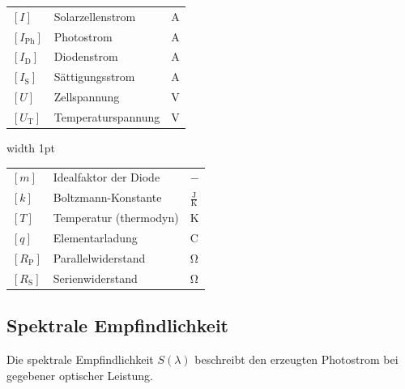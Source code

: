 \begin{minipage}[t]{0.42\columnwidth}
    \renewcommand{\arraystretch}{1.2}
    \begin{tabular}{@{} l p{2.5cm} l @{}}
        $[I]$             & Solarzellenstrom \dotfill                          & $\mathrm{A}$ \\
        $[I_\text{Ph}]$   & Photostrom \dotfill                    & $\mathrm{A}$ \\
        $[I_\text{D}]$    & Diodenstrom \dotfill                                   & $\mathrm{A}$ \\
        $[I_\text{S}]$    & Sättigungsstrom \dotfill                     & $\mathrm{A}$ \\
        $[U]$             & Zellspannung \dotfill                                  & $\mathrm{V}$ \\
        $[U_\text{T}]$    & Temperaturspannung \dotfill                            & $\mathrm{V}$ \\
    \end{tabular}
\end{minipage}
\hfill
\vrule width 1pt
\hfill
\begin{minipage}[t]{0.56\columnwidth}
    \renewcommand{\arraystretch}{1.2}
    \begin{tabular}{@{} l p{3.1cm} l @{}}
        $[m]$             & Idealfaktor der Diode \dotfill & $-$ \\
        $[k]$           & Boltzmann-Konstante  \dotfill & $\mathrm{\frac{J}{K}}$ \\
        $[T]$           & Temperatur (thermodyn) \dotfill          & $\mathrm{K}$ \\
        $[q]$           & Elementarladung \dotfill & $\mathrm{C}$ \\
        $[R_\text{P}]$   & Parallelwiderstand \dotfill & $\mathrm{\Omega}$ \\
        $[R_\text{S}]$   & Serienwiderstand \dotfill & $\mathrm{\Omega}$ \\
    \end{tabular}
\end{minipage}



\columnbreak
\subsection{Spektrale Empfindlichkeit}
Die spektrale Empfindlichkeit \( S(\lambda) \) beschreibt den erzeugten Photostrom bei gegebener optischer Leistung. 



